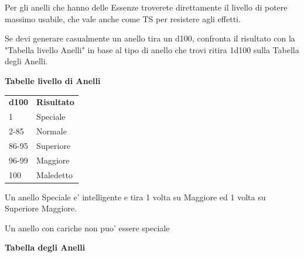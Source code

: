 \documentclass[a4paper,11pt,twoside,openany]{book}
\begin{document}
{Per gli anelli che hanno delle Essenze troverete direttamente il livello di potere massimo usabile, che vale anche come TS per resistere agli effetti.

Se devi generare casualmente un anello tira un d100, confronta il risultato con la "Tabella livello Anelli" in base al tipo di anello che trovi ritira 1d100 sulla Tabella degli Anelli.

\bigskip

\textbf{Tabelle livello di Anelli}

\medskip
\begin{tabular}{ll}
\toprule
\textbf{d100} & \textbf{Risultato}\tabularnewline
1 & Speciale\tabularnewline
2-85 & Normale\tabularnewline
86-95 & Superiore\tabularnewline
96-99 & Maggiore\tabularnewline
100 & Maledetto\tabularnewline

\end{tabular}

\bigskip

Un anello Speciale e' intelligente e tira 1 volta su Maggiore ed 1 volta su Superiore Maggiore.

Un anello con cariche non puo' essere speciale

\pagebreak

\textbf{Tabella degli Anelli}

\medskip

}
\end{document}
